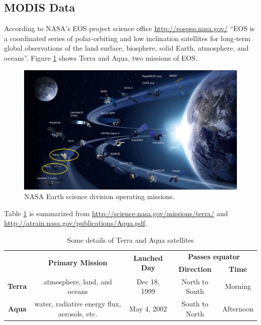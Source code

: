 \documentclass{article}
\begin{document}
\subsection{MODIS Data}\label{SubSec:ModisData}

According to NASA's EOS project science office \url{http://eospso.nasa.gov/}  ``EOS is a coordinated series of polar-orbiting and low inclination satellites for long-term global observations of the land surface, biosphere, solid Earth, atmosphere, and oceans''. Figure \ref{Fig: NASA EOS} shows Terra and Aqua, two missions of EOS.  
\begin{figure}[!ht]
\begin{center}
\includegraphics[width=16cm]{nasaEOS.png}
\caption{NASA Earth science division operating missions.}
\label{Fig: NASA EOS}
\end{center}
\end{figure}

Table \ref{Tab:TnA} is summarized from \url{http://science.nasa.gov/missions/terra/} and \url{http://atrain.nasa.gov/publications/Aqua.pdf}.

\begin{table}[!ht]
\caption{Some details of Terra and Aqua satellites}\label{Tab:TnA}
\centering
\def\arraystretch{1.5}
\begin{tabular}{c|cccc}
& \multirow{2}{*}{\textbf{Primary Mission}} &\multirow{2}{*}{\textbf{Lauched Day}} 
& \multicolumn{2}{c}{\textbf{Passes equator}}\\
\cline{4-5}
& & & \textbf{Direction} & \textbf{Time}\\
\hline
\textbf{Terra} & atmosphere, land, and oceans & Dec 18, 1999  & North to South & Morning\\
\textbf{Aqua} & water, radiative energy flux, aerosols, etc. & May 4, 2002  & South to North & Afternoon
\end{tabular}
\end{table}
\end{document}
